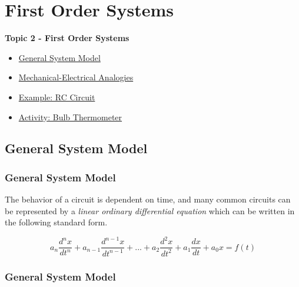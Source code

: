 \documentclass[fleqn]{beamer} %
\newcommand{\sectionIItitle}{First Order Systems}
\newcommand{\sectionIIsubsectionItitle}{General System Model}
\newcommand{\sectionIIsubsectionIItitle}{Mechanical-Electrical Analogies}
\newcommand{\sectionIIsubsectionIIItitle}{Example: RC Circuit}
\newcommand{\sectionIIsubsectionIVtitle}{Activity: Bulb Thermometer}
\begin{document}
	
	\section{\sectionIItitle}\label{sectionII}

		\begin{frame}
			\large \textbf{Topic 2 - \sectionIItitle} \vspace{3mm}\\

			\begin{itemize}
				\item \hyperlink{sectionIIsubsectionI}{\sectionIIsubsectionItitle} \vspc %
				\item \hyperlink{sectionIIsubsectionII}{\sectionIIsubsectionIItitle} \vspc %
				\item \hyperlink{sectionIIsubsectionIII}{\sectionIIsubsectionIIItitle} \vspc %
				\item \hyperlink{sectionIIsubsectionIV}{\sectionIIsubsectionIVtitle} \vspc %
			\end{itemize}

		\end{frame}

		\subsection{\sectionIIsubsectionItitle}\label{sectionIIsubsectionI}

			\begin{frame}[label=sectionIIsubsectionI]
				\frametitle{\sectionIIsubsectionItitle}

				The behavior of a circuit is dependent on time, and many common circuits can be represented by a {\it linear ordinary differential equation} which can be written in the following standard form. 

\[ a_n\frac{d^nx}{dt^n}+a_{n-1}\frac{d^{n-1}x}{dt^{n-1}}+...+a_2\frac{d^2x}{dt^2}+a_1\frac{dx}{dt}+a_0x=f(t) \] 
\vspace{0mm}
	



			\end{frame}

		    \begin{frame}[label=sectionIIsubsectionI]
				\frametitle{\sectionIIsubsectionItitle}





			\end{frame}	
\end{document}
